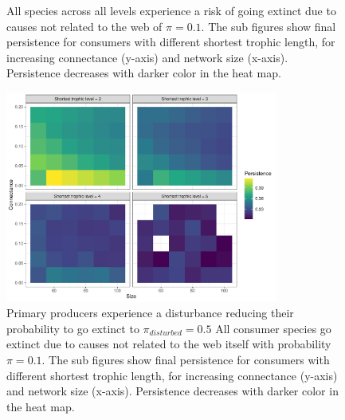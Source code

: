 \documentclass[12pt]{article}
\begin{document}
\begin{spacing}{2.0}
\begin{figure}
     \caption{All species across all levels experience a risk of going extinct due to causes not related to the web of $\pi = 0.1$. The sub figures show final persistence for consumers with different shortest trophic length, for increasing connectance (y-axis) and network size (x-axis). Persistence decreases with darker color in the heat map.}
     \label{fig:heatmap_stl_BP0}
 \end{figure}

 \begin{figure}
     \centering
     \includegraphics[width=0.8\textwidth]{figures/heatmap_STL_allCS_BP1.pdf}
    
     \caption{Primary producers experience a disturbance reducing their probability to go extinct to $\pi_{disturbed} = 0.5$ All consumer species go extinct due to causes not related to the web itself with probability $\pi = 0.1$. The sub figures show final persistence for consumers with different shortest trophic length, for increasing connectance (y-axis) and network size (x-axis). Persistence decreases with darker color in the heat map.}
     \label{fig:heatmap_stl_BP1}
 \end{figure}

\clearpage 
 

\end{spacing}
\end{document}
